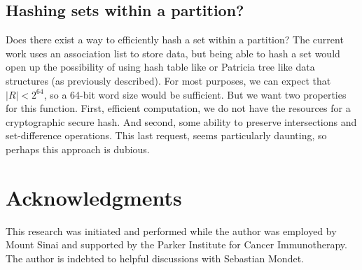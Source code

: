 \documentclass{article}
\begin{document}
\subsection{Hashing sets within a partition?}

Does there exist a way to efficiently hash a set within a partition?
The current work uses an association list to store data, but being able to
hash a set would open up the possibility of using hash table like
or Patricia tree like data structures (as previously
described\cite{Okasaki1998}).
For most purposes,
we can expect that $|R|<2^{64}$,
so a 64-bit word size would be sufficient.
But we want two properties for this function.
First, efficient computation, we do not have the resources for a cryptographic
secure hash.
And second,
some ability to preserve intersections and set-difference operations.
This last request, seems particularly daunting,
so perhaps this approach is dubious.

\section{Acknowledgments}

This research was initiated and performed while the author was employed by
Mount Sinai and supported by the Parker Institute for Cancer Immunotherapy.
The author is indebted to helpful discussions with Sebastian Mondet.

\clearpage



\end{document}
